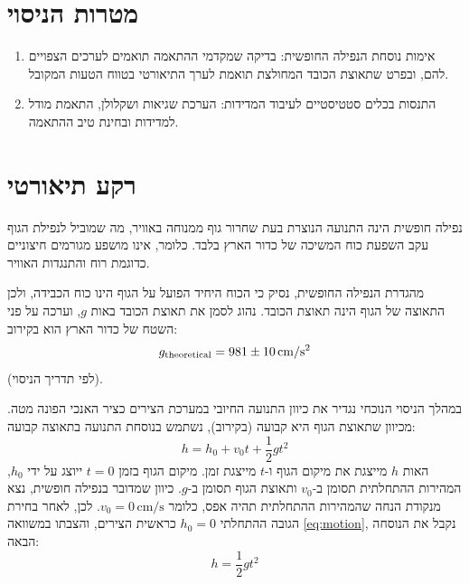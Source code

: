 \documentclass[10pt,a4paper]{article}
\newcommand{\added}[1]{\textcolor{addedblue}{#1}}
\newcommand{\partner}[1]{\textcolor{partnergreen}{#1}}
\newcommand{\U}[1]{\,\mathrm{#1}}
\begin{document}

\setcounter{page}{1}

\section*{מטרות הניסוי}
\begin{enumerate}
  \item אימות נוסחת הנפילה החופשית\added{:} \partner{בדיקה שמקדמי ההתאמה תואמים לערכים הצפויים להם,} \added{ובפרט שתאוצת הכובד המחולצת תואמת לערך התיאורטי בטווח הטעות המקובל.}
  \item התנסות בכלים סטטיסטיים \added{לעיבוד המדידות: הערכת שגיאות ושקלולן, התאמת מודל למדידות ובחינת טיב ההתאמה}.
\end{enumerate}

\section*{רקע תיאורטי}
נפילה חופשית הינה התנועה הנוצרת בעת שחרור גוף ממנוחה באוויר, מה שמוביל לנפילת הגוף עקב השפעת כוח המשיכה של כדור הארץ בלבד. כלומר, אינו מושפע מגורמים חיצוניים כדוגמת רוח והתנגדות האוויר.

מהגדרת הנפילה החופשית, נסיק כי הכוח היחיד הפועל על הגוף הינו כוח הכבידה, ולכן התאוצה של הגוף הינה תאוצת הכובד. נהוג לסמן את תאוצת הכובד באות $g$, וערכה על פני השטח של כדור הארץ הוא בקירוב:
\[ g_{\mathrm{theoretical}} = \GTheo\U{cm/s^2} \]
(לפי תדריך הניסוי).

במהלך הניסוי הנוכחי נגדיר את כיוון התנועה החיובי במערכת הצירים כציר האנכי הפונה מטה. מכיוון שתאוצת הגוף היא קבועה (בקירוב), נשתמש בנוסחת התנועה בתאוצה קבועה:
\begin{equation}\label{eq:motion}
h = h_0 + v_0 t + \frac{1}{2} g t^2
\end{equation}
האות $h$ מייצגת את מיקום הגוף ו-$t$ מייצגת זמן. מיקום הגוף בזמן $t=0$ ייוצג על ידי $h_0$, המהירות ההתחלתית תסומן ב-$v_0$ ותאוצת הגוף תסומן ב-$g$. כיוון שמדובר בנפילה חופשית, נצא מנקודת הנחה שהמהירות ההתחלתית תהיה אפס, כלומר $v_0 = 0\U{cm/s}$. לכן, לאחר בחירת הגובה ההתחלתי $h_0 = 0$ כראשית הצירים, והצבתו במשוואה \eqref{eq:motion}, נקבל את הנוסחה הבאה:
\begin{equation}\label{eq:freefall}
h = \frac{1}{2} g t^2
\end{equation}
\end{document}
